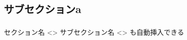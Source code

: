 \subsection{サブセクションa}
\begin{frame}{}
  \frametitle{\insertsubsection}
  セクション名
  <\insertsection>
  サブセクション名
  <\insertsubsection>
  も自動挿入できる
\end{frame}
